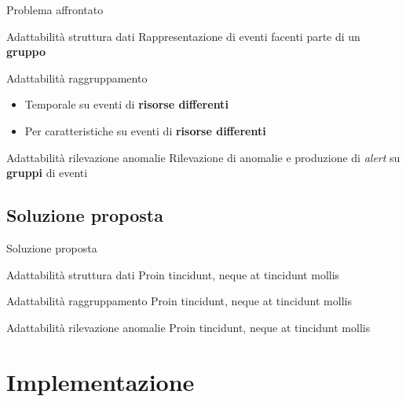 \documentclass{beamer}
\begin{document}
	\begin{frame}{Problema affrontato}

		\begin{alertblock}{Adattabilità struttura dati}
			Rappresentazione di eventi facenti parte di un \textbf{gruppo} \vspace{.5em}
		\end{alertblock} \vspace{.2em}
		
		\begin{alertblock}{Adattabilità raggruppamento}
			\begin{itemize}
				\item Temporale su eventi di \textbf{risorse differenti} \vspace{.5em}
				\item Per caratteristiche su eventi di \textbf{risorse differenti} \vspace{.5em}
			\end{itemize}
		\end{alertblock}
		
		\begin{alertblock}{Adattabilità rilevazione anomalie}
			Rilevazione di anomalie e produzione di \textit{alert} su \textbf{gruppi} di eventi \vspace{.5em} 
		\end{alertblock}
	\end{frame}
	
	\subsection{Soluzione proposta}

	\begin{frame}{Soluzione proposta}
		\begin{exampleblock}{Adattabilità struttura dati}
			Proin tincidunt, neque at tincidunt mollis
		\end{exampleblock}
		
		\begin{exampleblock}{Adattabilità raggruppamento}
			Proin tincidunt, neque at tincidunt mollis
		\end{exampleblock}
		
		\begin{exampleblock}{Adattabilità rilevazione anomalie}
			Proin tincidunt, neque at tincidunt mollis
		\end{exampleblock}
	\end{frame}
	
	\section{Implementazione}
\end{document}
